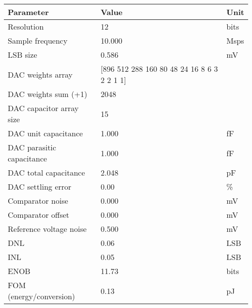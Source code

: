 \begin{tabular}{lll}
\toprule
Parameter & Value & Unit \\
\midrule
Resolution & 12 & bits \\
Sample frequency & 10.000 & Msps \\
LSB size & 0.586 & mV \\
DAC weights array & [896 512 288 160  80  48  24  16   8   6   3   2   2   1   1] &  \\
DAC weights sum (+1) & 2048 &  \\
DAC capacitor array size & 15 &  \\
DAC unit capacitance & 1.000 & fF \\
DAC parasitic capacitance & 1.000 & fF \\
DAC total capacitance & 2.048 & pF \\
DAC settling error & 0.00 & \% \\
Comparator noise & 0.000 & mV \\
Comparator offset & 0.000 & mV \\
Reference voltage noise & 0.500 & mV \\
DNL & 0.06 & LSB \\
INL & 0.05 & LSB \\
ENOB & 11.73 & bits \\
FOM (energy/conversion) & 0.13 & pJ \\
\bottomrule
\end{tabular}
